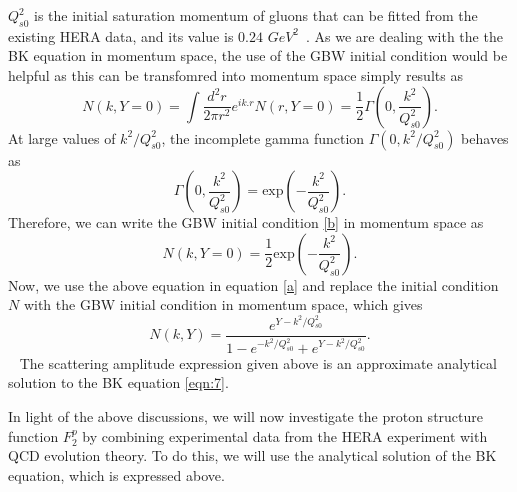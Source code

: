 \documentclass[12pt]{article}
\begin{document}
$Q_{s0} ^2$ is the initial saturation momentum of gluons that can be fitted from the existing HERA data, and its value is $0.24$ $GeV^{2}$~\cite{al}. As we are dealing with the the BK equation in momentum space, the use of the GBW initial condition would be helpful as this can be transfomred into momentum space simply results as
\begin{equation}
	N(k,Y=0) = \int \frac{d^2 r}{2\pi r^2} e^{ik.r} N(r,Y=0) =\frac{1}{2}\Gamma\left(0, \frac{k^2}{Q_{s0} ^2}\right).
\end{equation}
At large values of $k^2 / Q_{s0} ^2$, the incomplete gamma function $\Gamma(0,k^2/Q_{s0} ^2)$ behaves as 
\begin{equation}
	\Gamma\left(0,\frac{k^2}{Q_{s0} ^2}\right)=\text{exp}\left(-\frac{k^2}{Q_{s0} ^2}\right).
\end{equation}
Therefore, we can write the GBW initial condition \eqref{b} in momentum space as 
\begin{equation}
	N(k,Y=0) =\frac{1}{2}\text{exp}\left(-\frac{k^2}{Q_{s0} ^2}\right).
\end{equation} 
Now, we use the above equation in equation \eqref{a} and replace the initial condition $N$ with the GBW initial condition in momentum space, which gives
\begin{equation}\label{c}
	N(k,Y)=\frac{e^{Y-k^2/Q_{s0} ^2}}{1-e^{-k^2/Q_{s0} ^2}+e^{Y-k^2/Q_{s0} ^2}}.
\end{equation}  
The scattering amplitude expression given above is an approximate analytical solution to the BK equation \eqref{eqn:7}. 

In light of the above discussions, we will now investigate the proton structure function $F_2 ^p$ by combining experimental data from the HERA experiment with QCD evolution theory. To do this, we will use the analytical solution of the BK equation, which is expressed above.
\end{document}
